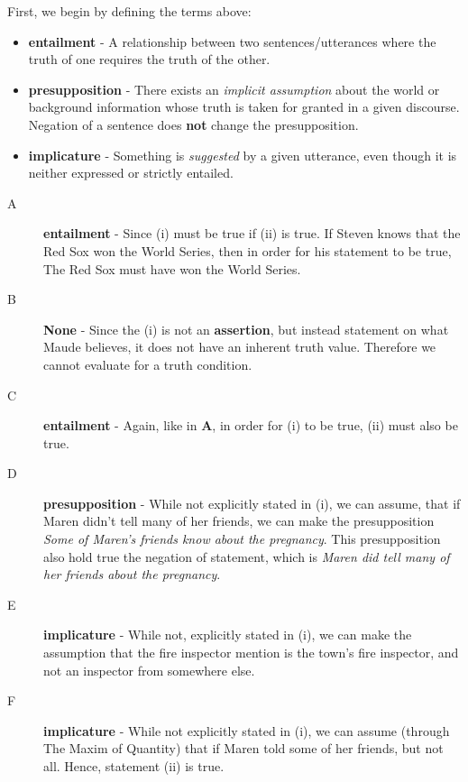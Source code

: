 \documentclass[11pt]{article}
\begin{document}
\newpage

\begin{solution}
First, we begin by defining the terms above:
\begin{itemize}
    \item \textbf{entailment} - A relationship between two sentences/utterances where the truth of one requires the truth of the other.

    \item \textbf{presupposition} - There exists an \textit{implicit assumption} about the world or background information whose truth is taken for granted in a given discourse.  Negation of a sentence does \textbf{not} change the presupposition.

    \item \textbf{implicature} - Something is \textit{suggested} by a given utterance, even though it is neither expressed or strictly entailed.
\end{itemize}
\begin{description}
    \item[A] \textbf{entailment} - Since (i) must be true if (ii) is true.  If Steven knows that the Red Sox won the World Series, then in order for his statement to be true, The Red Sox must have won the World Series.  
    
    \item[B] \textbf{None} - Since the (i) is not an \textbf{assertion}, but instead statement on what Maude believes, it does not have an inherent truth value.  Therefore we cannot evaluate for a truth condition. 
     
    \item[C] \textbf{entailment} - Again, like in \textbf{A}, in order for (i) to be true, (ii) must also be true.
     
    \item[D] \textbf{presupposition} - While not explicitly stated in (i), we can assume, that if Maren didn't tell many of her friends, we can make the presupposition \textit{Some of Maren's friends know about the pregnancy}. This presupposition also hold true the negation of statement, which is \textit{Maren did tell many of her friends about the pregnancy}.

    \item[E] \textbf{implicature} - While not, explicitly stated in (i), we can make the assumption that the fire inspector mention is the town's fire inspector, and not an inspector from somewhere else.
     
    \item[F] \textbf{implicature} - While not explicitly stated in (i), we can assume (through The Maxim of Quantity) that if Maren told some of her friends, but not all.  Hence, statement (ii) is true.

\end{description}

\end{solution}
\end{document}

